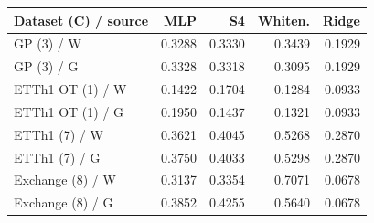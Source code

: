 \begin{tabular}{lrrrr}
\toprule
Dataset (C) / source & MLP & S4 & Whiten. & Ridge \\
\midrule
GP (3) / W & 0.3288 & 0.3330 & 0.3439 & 0.1929 \\
GP (3) / G & 0.3328 & 0.3318 & 0.3095 & 0.1929 \\
ETTh1 OT (1) / W & 0.1422 & 0.1704 & 0.1284 & 0.0933 \\
ETTh1 OT (1) / G & 0.1950 & 0.1437 & 0.1321 & 0.0933 \\
ETTh1 (7) / W & 0.3621 & 0.4045 & 0.5268 & 0.2870 \\
ETTh1 (7) / G & 0.3750 & 0.4033 & 0.5298 & 0.2870 \\
Exchange (8) / W & 0.3137 & 0.3354 & 0.7071 & 0.0678 \\
Exchange (8) / G & 0.3852 & 0.4255 & 0.5640 & 0.0678 \\
\bottomrule
\end{tabular}
